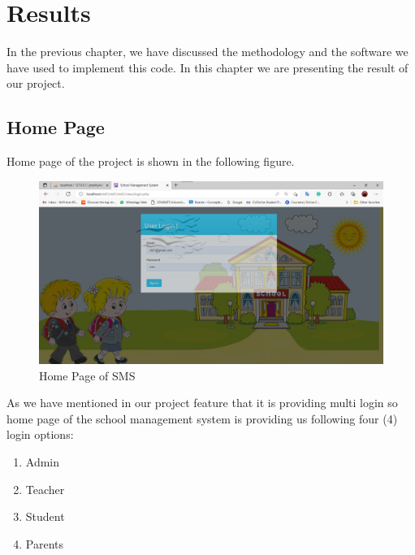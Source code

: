 \chapter{Results}
\label{chp4}
In the previous chapter, we have discussed the methodology and the software we have used to implement this code. In this chapter we are presenting the result of our project.
\section{Home Page}
Home page of the project is shown in the following figure.
\begin{figure}[H]  %
\begin{center}
\includegraphics[scale=0.45]{Chapter4/homePage}
\caption{Home Page of SMS}
\label{homePage}
\end{center}
\end{figure}
As we have mentioned in our project feature that it is providing multi login so home page of the school management system is providing us following four (4) login options:
\begin{enumerate}
 \item Admin
 \item Teacher 
 \item Student
 \item Parents
\end{enumerate}
